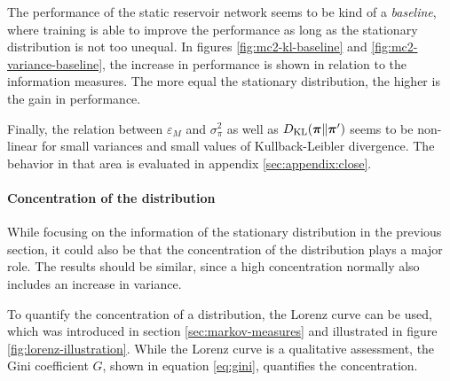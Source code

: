The performance of the static reservoir network seems to be kind of a \emph{baseline}, where training is able to improve the performance as long as the stationary distribution is not too unequal. In figures \ref{fig:mc2-kl-baseline} and \ref{fig:mc2-variance-baseline}, the increase in performance is shown in relation to the information measures. The more equal the stationary distribution, the higher is the gain in performance.

Finally, the relation between $\varepsilon_M$ and $\sigma^2_\pi$ as well as $D_{\text{KL}}(\bm\pi\|\bm\pi')$ seems to be non-linear for small variances and small values of Kullback-Leibler divergence. The behavior in that area is evaluated in appendix \ref{sec:appendix:close}.

\paragraph{Concentration of the distribution}

While focusing on the information of the stationary distribution in the previous section, it could also be that the concentration of the distribution plays a major role. The results should be similar, since a high concentration normally also includes an increase in variance.

To quantify the concentration of a distribution, the Lorenz curve can be used, which was introduced in section \ref{sec:markov-measures} and illustrated in figure \ref{fig:lorenz-illustration}. While the Lorenz curve is a qualitative assessment, the Gini coefficient $G$, shown in equation \eqref{eq:gini}, quantifies the concentration.

